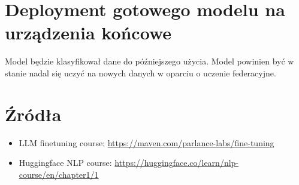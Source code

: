 \documentclass[12pt]{article}
\begin{document}
\section*{Deployment gotowego modelu na urządzenia końcowe}
Model będzie klasyfikował dane do późniejszego użycia. Model powinien być w stanie nadal się uczyć na nowych danych w oparciu o uczenie federacyjne.

\section*{Źródła}
\begin{itemize}
    \item LLM finetuning course: \url{https://maven.com/parlance-labs/fine-tuning}
    \item Huggingface NLP course: \url{https://huggingface.co/learn/nlp-course/en/chapter1/1}
\end{itemize}
\end{document}
